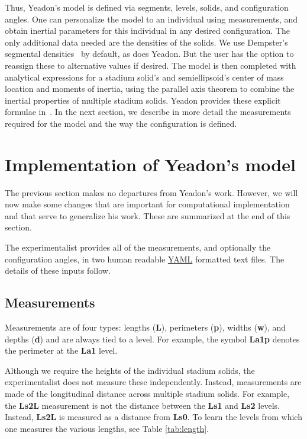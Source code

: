\documentclass[10pt,a4paper,twocolumn]{article}
\begin{document}
Thus, Yeadon's model is defined via segments, levels, solids, and configuration
angles. One can personalize the model to an individual using measurements, and
obtain inertial parameters for this individual in any desired configuration.
The only additional data needed are the densities of the solids. We use
Dempster's segmental densities~\cite{Dempster1955} by default, as does Yeadon.
But the user has the option to reassign these to alternative values if desired.
The model is then completed with analytical expressions for a stadium solid's
and semiellipsoid's center of mass location and moments of inertia, using the
parallel axis theorem to combine the inertial properties of multiple stadium
solids. Yeadon provides these explicit formulae in~\cite{Yeadon1990f}. In the
next section, we describe in more detail the measurements required for the
model and the way the configuration is defined.

\section*{Implementation of Yeadon's model}

The previous section makes no departures from Yeadon's work. However, we will
now make some changes that are important for computational implementation and
that serve to generalize his work. These are summarized at the end of this
section.

The experimentalist provides all of the measurements, and optionally the
configuration angles, in two human readable \href{http://yaml.org}{YAML}
formatted text files. The details of these inputs follow.

\subsection*{Measurements}

Measurements are of four types: lengths (\textbf{L}), perimeters (\textbf{p}),
widths (\textbf{w}), and depths (\textbf{d}) and are always tied to a level.
For example, the symbol \textbf{La1p} denotes the perimeter at the \textbf{La1}
level.

Although we require the heights of the individual stadium solids, the
experimentalist does not measure these independently. Instead, measurements are
made of the longitudinal distance across multiple stadium solids. For example,
the \textbf{Ls2L} measurement is not the distance between the \textbf{Ls1} and
\textbf{Ls2} levels. Instead, \textbf{Ls2L} is measured as a distance from
\textbf{Ls0}. To learn the levels from which one measures the various lengths,
see Table \ref{tab:length}.
\end{document}
